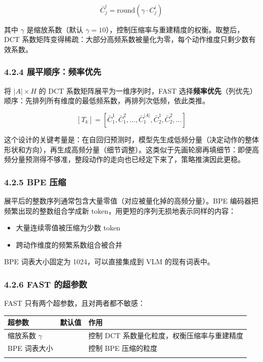 \documentclass[
  chinese,
]{ctexart}
\providecommand{\tightlist}{%
  \setlength{\itemsep}{0pt}\setlength{\parskip}{0pt}}
\begin{document}
\[
\bar{C}^i_j = \text{round}(\gamma \cdot C^i_j)
\]

其中 \(\gamma\) 是缩放系数（默认
\(\gamma = 10\)），控制压缩率与重建精度的权衡。取整后，DCT
系数矩阵变得稀疏：大部分高频系数被量化为零，每个动作维度只剩少数有效系数。

\subsubsection{4.2.4
展平顺序：频率优先}\label{ux5c55ux5e73ux987aux5e8fux9891ux7387ux4f18ux5148}

将 \(|A| \times H\) 的 DCT 系数矩阵展平为一维序列时，FAST
选择\textbf{频率优先}（列优先）顺序：先排列所有维度的最低频系数，再排列次低频，依此类推。

\[
[T_k] = [\bar{C}^1_1, \bar{C}^2_1, \ldots, \bar{C}^{|A|}_1, \bar{C}^1_2, \bar{C}^2_2, \ldots]
\]

这个设计的关键考量是：在自回归预测时，模型先生成低频分量（决定动作的整体形状和方向），再生成高频分量（细节调整）。这类似于先画轮廓再填细节：即便高频分量预测得不够准，整段动作的走向也已经定下来了，策略推演因此更稳。

\subsubsection{4.2.5 BPE 压缩}\label{bpe-ux538bux7f29}

展平后的整数序列通常包含大量零值（对应被量化掉的高频分量）。BPE
编码器把频繁出现的整数组合学成新
token，用更短的序列无损地表示同样的内容：

\begin{itemize}
\tightlist
\item
  大量连续零值被压缩为少数 token
\item
  跨动作维度的频繁系数组合被合并
\end{itemize}

BPE 词表大小固定为 1024，可以直接集成到 VLM 的现有词表中。

\subsubsection{4.2.6 FAST 的超参数}\label{fast-ux7684ux8d85ux53c2ux6570}

FAST 只有两个超参数，且对两者都不敏感：

\begin{center}
\begin{tabular}{@{}>{\raggedright\arraybackslash}p{} >{\raggedright\arraybackslash}p{} >{\raggedright\arraybackslash}p{}@{}}
\toprule\noalign{}
超参数 & 默认值 & 作用 \\
\midrule\noalign{}
缩放系数 \(\gamma\) & 10 & 控制 DCT 系数量化粒度，权衡压缩率与重建精度 \\
BPE 词表大小 & 1024 & 控制 BPE 压缩的粒度 \\
\bottomrule\noalign{}
\end{tabular}
\end{center}
\end{document}
